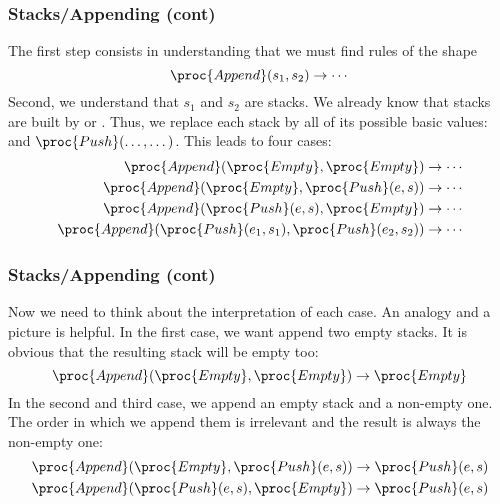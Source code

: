 %
\begin{frame}
\frametitle{Stacks/Appending (cont)}

The first step consists in understanding that we must find rules of
the shape
\[
\proc{Append} (s_1, s_2) \rightarrow \cdots
\]
Second, we understand that \(s_1\) and \(s_2\) are stacks. We already
know that stacks are built by  or . Thus, we
replace each stack by all of its possible basic values: 
and \(\proc{Push} (\dots, \dots)\). This leads to four cases:
\begin{align*}
  \proc{Append} (\proc{Empty}, \proc{Empty})
& \rightarrow \cdots\\
  \proc{Append} (\proc{Empty}, \proc{Push} (e, s))
& \rightarrow \cdots\\
  \proc{Append} (\proc{Push} (e, s), \proc{Empty})
& \rightarrow \cdots\\
  \proc{Append} (\proc{Push} (e_1, s_1), \proc{Push} (e_2, s_2))
& \rightarrow \cdots
\end{align*}

\end{frame}

%
\begin{frame}
\frametitle{Stacks/Appending (cont)}

Now we need to think about the interpretation of each case. An analogy
and a picture is helpful. In the first case, we want append two empty
stacks. It is obvious that the resulting stack will be empty too:
\[
  \proc{Append} (\proc{Empty}, \proc{Empty}) \rightarrow \proc{Empty}
\]
In the second and third case, we append an empty stack and a non-empty
one. The order in which we append them is irrelevant and the result is
always the non-empty one:
\begin{align*}
  \proc{Append} (\proc{Empty}, \proc{Push} (e, s))
& \rightarrow \proc{Push} (e, s)\\
  \proc{Append} (\proc{Push} (e, s), \proc{Empty})
& \rightarrow \proc{Push} (e, s)
\end{align*}

\end{frame}

